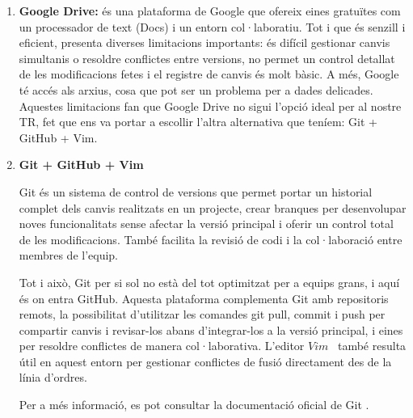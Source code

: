 \begin{enumerate}

 \item \textbf{Google Drive: }és una plataforma de Google que ofereix eines gratuïtes com un processador de text (Docs) i un entorn col·laboratiu. Tot i que és senzill i eficient, presenta diverses limitacions importants: és difícil gestionar canvis simultanis o resoldre conflictes entre versions, no permet un control detallat de les modificacions fetes i el registre de canvis és molt bàsic. A més, Google té accés als arxius, cosa que pot ser un problema per a dades delicades. Aquestes limitacions fan que Google Drive no sigui l’opció ideal per al nostre TR, fet que ens va portar a escollir l’altra alternativa que teníem: Git + GitHub + Vim.

\item \textbf{Git + GitHub + Vim}

Git és un sistema de control de versions \cite{ControlDeVersions} que permet portar un historial complet dels canvis realitzats en un projecte, crear branques per desenvolupar noves funcionalitats sense afectar la versió principal i oferir un control total de les modificacions. També facilita la revisió de codi i la col·laboració entre membres de l’equip.

Tot i això, Git per si sol no està del tot optimitzat per a equips grans, i aquí és on entra GitHub. Aquesta plataforma complementa Git amb repositoris remots, la possibilitat d’utilitzar les comandes git pull, commit i push per compartir canvis i revisar-los abans d’integrar-los a la versió principal, i eines per resoldre conflictes de manera col·laborativa. L’editor $Vim$~\cite{Vim} també resulta útil en aquest entorn per gestionar conflictes de fusió directament des de la línia d’ordres.\\

Per a més informació, es pot consultar la documentació oficial de Git \cite{PaginaoficialdelGit}.
\end{enumerate}

